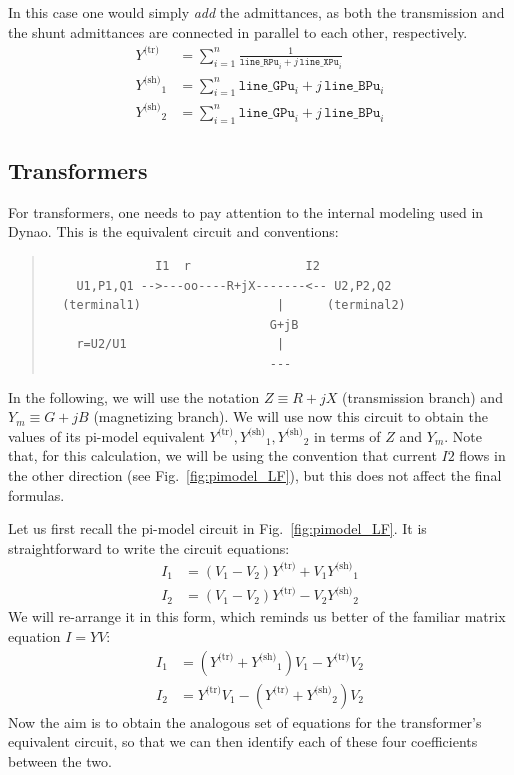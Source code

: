 \documentclass[a4paper,11pt]{article}
\newcommand{\code}[1]{\texttt{#1}}  %
\newcommand{\Dynawo}{Dyna\textomega o} %
\newcommand{\Ytr}{\ensuremath{Y^{\textrm{(tr)}}}}
\newcommand{\Ysh}{\ensuremath{Y^{\textrm{(sh)}}}}
\begin{document}
In this case one would simply \emph{add} the admittances, as both the transmission and
the shunt admittances are connected in parallel to each other, respectively.
\begin{equation}
  \begin{split}
    \Ytr   & = \sum_{i=1}^n \frac{1}{\code{line\_RPu}_i + j \, \code{line\_XPu}_i} \\
    \Ysh_1 & = \sum_{i=1}^n \code{line\_GPu}_i + j \, \code{line\_BPu}_i \\
    \Ysh_2 & = \sum_{i=1}^n \code{line\_GPu}_i + j \, \code{line\_BPu}_i
  \end{split}
\end{equation}





\subsection{Transformers}
\label{app:xfmr}

For transformers, one needs to pay attention to the internal modeling used in \Dynawo.
This is the equivalent circuit and conventions:
\begin{quote}
  \begin{verbatim}
               I1  r                I2
    U1,P1,Q1 -->---oo----R+jX-------<-- U2,P2,Q2
  (terminal1)                   |      (terminal2)
                               G+jB
    r=U2/U1                     |
                               ---
  \end{verbatim}
\end{quote}
In the following, we will use the notation $Z \equiv R+jX$ (transmission branch)
and $Y_m \equiv G + jB$ (magnetizing branch).  We will use now this circuit
to obtain the values of its pi-model equivalent $\Ytr, \Ysh_1, \Ysh_2$ in terms of
$Z$ and $Y_m$. Note that, for this calculation, we will be using the convention
that current $I2$ flows in the other direction (see Fig.~\ref{fig:pimodel_LF}),
but this does not affect the final formulas.

Let us first recall the pi-model circuit in Fig.~\ref{fig:pimodel_LF}. It is
straightforward to write the circuit equations:
\begin{equation*}
  \begin{split}
    I_1 & = (V_1 - V_2) \Ytr + V_1 \Ysh_1 \\
    I_2 & = \left(V_1 - V_2\right) \Ytr - V_2 \Ysh_2
  \end{split}
\end{equation*}
We will re-arrange it in this form, which reminds us better of the familiar
matrix equation $I = Y V$:
\begin{equation}
  \label{eq:pimodelIV}
  \begin{split}
    I_1 & = \left( \Ytr + \Ysh_1 \right) V_1 - \Ytr V_2 \\
    I_2 & = \Ytr V_1 - \left( \Ytr + \Ysh_2 \right) V_2
  \end{split}
\end{equation}
Now the aim is to obtain the analogous set of equations for the transformer's
equivalent circuit, so that we can then identify each of these four
coefficients between the two.
\end{document}
